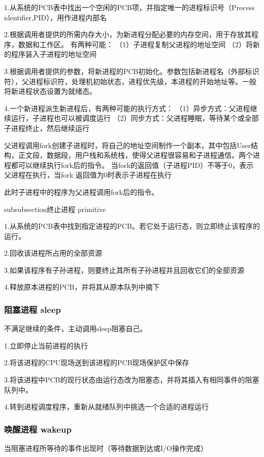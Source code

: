 \documentclass{ctexart}
\begin{document}
1.从系统的PCB表中找出一个空闲的PCB项，并指定唯一的进程标识号（Process identifier,PID），用作进程内部名

2.根据调用者提供的所需内存大小，为新进程分配必要的内存空间，用于存放其程序，数据和工作区。
有两种可能：
（1）子进程复制父进程的地址空间
（2）将新的程序装入子进程的地址空间

3.根据调用者提供的参数，将新进程的PCB初始化。参数包括新进程名（外部标识符），父进程标识符，处理机初始状态，进程优先级，本进程的开始地址等。一般将新进程状态设置为就绪态。

4.一个新进程派生新进程后，有两种可能的执行方式：
（1）异步方式：父进程继续运行，子进程也可以被调度运行
（2）同步方式：父进程睡眠，等待某个或全部子进程终止，然后继续运行

父进程调用fork创建子进程时，将自己的地址空间制作一个副本，其中包括User结构，正文段，数据段，用户栈和系统栈，使得父进程很容易和子进程通信。两个进程都可以继续执行fork后的指令。
当fork的返回值（子进程PID）不等于0，表示父进程在执行，当fork 返回值为0时表示子进程在执行

此时子进程中的程序为父进程调用fork后的指令。

subsubsection{终止进程 primitive}

1.从系统的PCB表中找到指定进程的PCB。若它处于运行态，则立即终止该程序的运行。

2.回收该进程所占用的全部资源

3.如果该程序有子孙进程，则要终止其所有子孙进程并且回收它们的全部资源

4.释放原本进程的PCB，并将其从原本队列中摘下

\subsubsection{阻塞进程 sleep}

不满足继续的条件，主动调用sleep阻塞自己。

1.立即停止当前进程的执行

2.将该进程的CPU现场送到该进程的PCB现场保护区中保存

3.将该进程中PCB的现行状态由运行态改为阻塞态，并将其插入有相同事件的阻塞队列中。

4.转到进程调度程序，重新从就绪队列中挑选一个合适的进程运行

\subsubsection{唤醒进程 wakeup}

当阻塞进程所等待的事件出现时（等待数据到达或I/O操作完成）
\end{document}
